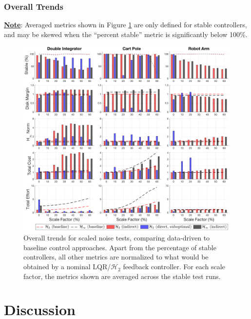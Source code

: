 \subsubsection{Overall Trends}
\underline{\textbf{Note}}: Averaged metrics shown in Figure \ref{fig:overall_trends_noise_subopt_bar} are only defined for stable controllers, and may be skewed when the ``percent stable'' metric is significantly below 100\%.
\begin{figure}[H]
\centering
	\includegraphics[width=\textwidth]{figures/overall_trends_noise_subopt_bar.png}
\caption{Overall trends for scaled noise tests, comparing data-driven to baseline control approaches.  Apart from the percentage of stable controllers, all other metrics are normalized to what would be obtained by a nominal LQR/$\mathcal{H}_{2}$ feedback controller.  For each scale factor, the metrics shown are averaged across the stable test runs.}
\label{fig:overall_trends_noise_subopt_bar}
\end{figure}

\section{Discussion}
\label{sect:results:discussion}
